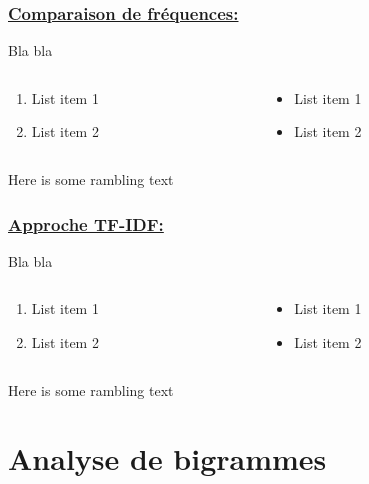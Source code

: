 \documentclass[xcolor=dvipsnames]{beamer}
\begin{document}
	\begin{frame}
		\frametitle{\underline{Comparaison de fréquences:}}
		Bla bla 
		\begin{columns}
			\begin{column}{0.5\textwidth} %
				\begin{enumerate}
					\item List item 1
					\item List item 2
				\end{enumerate}
			\end{column}
			\begin{column}{0.5\textwidth}
				\begin{itemize}
					\item List item 1
					\item List item 2
				\end{itemize}
			\end{column}
		\end{columns}
		\vspace{\baselineskip}
		Here is some rambling text
	\end{frame}

	\begin{frame}
		\frametitle{\underline{Approche TF-IDF:}}
		Bla bla 
		\begin{columns}
			\begin{column}{0.5\textwidth} %
				\begin{enumerate}
					\item List item 1
					\item List item 2
				\end{enumerate}
			\end{column}
			\begin{column}{0.5\textwidth}
				\begin{itemize}
					\item List item 1
					\item List item 2
				\end{itemize}
			\end{column}
		\end{columns}
		\vspace{\baselineskip}
		Here is some rambling text
	\end{frame}

	\section*{Analyse de bigrammes}
\end{document}
